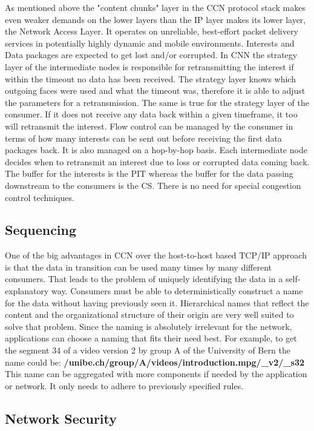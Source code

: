 As mentioned above the "content chunks" layer in the CCN protocol stack makes even weaker demands on the lower layers than the IP layer makes its lower layer, the Network Access Layer. It operates on unreliable, best-effort packet delivery services in potentially highly dynamic and mobile environments. Interests and Data packages are expected to get lost and/or corrupted. In CNN the strategy layer of the intermediate nodes is responsible for retransmitting the interest if within the timeout no data has been received. The strategy layer knows which outgoing faces were used and what the timeout was, therefore it is able to adjust the parameters for a retransmission. The same is true for the strategy layer of the consumer. If it does not receive any data back within a given timeframe, it too will retransmit the interest.
Flow control can be managed by the consumer in terms of how many interests can be sent out before receiving the first data packages back. It is also managed on a hop-by-hop basis. Each intermediate node decides when to retransmit an interest due to loss or corrupted data coming back. The buffer for the interests is the PIT whereas the buffer for the data passing downstream to the consumers is the CS. There is no need for special congestion control techniques.

\subsection{Sequencing}

One of the big advantages in CCN over the host-to-host based TCP/IP approach is that the data in transition can be used many times by many different consumers. That leads to the problem of uniquely identifying the data in a self-explanatory way. Consumers must be able to deterministically construct a name for the data without having previously seen it. Hierarchical names that reflect the content and the organizational structure of their origin are very well suited to solve that problem. Since the naming is absolutely irrelevant for the network, applications can choose a naming that fits their need best. For example, to get the segment 34 of a video version 2 by group A of the University of Bern the name could be: \textbf{/unibe.ch/group/A/videos/introduction.mpg/\_v2/\_s32}\\
This name can be aggregated with more components if needed by the application or network. It only needs to adhere to previously specified rules.


\subsection{Network Security}


